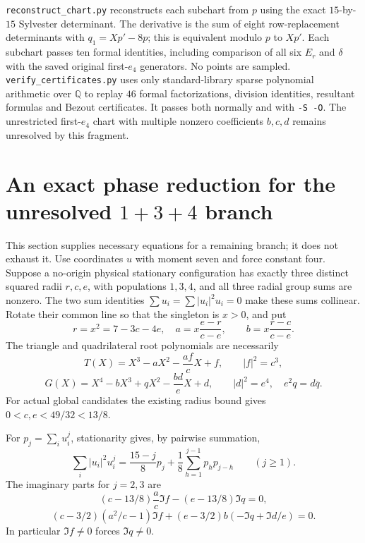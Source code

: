 \documentclass[11pt,a4paper]{article}
\theoremstyle{remark}
\begin{document}
\texttt{reconstruct\_chart.py} reconstructs each subchart from \(p\)
using the exact \(15\)-by-\(15\) Sylvester determinant. The derivative
is the sum of eight row-replacement determinants with
\(q_1=Xp'-8p\); this is equivalent modulo \(p\) to \(Xp'\).
Each subchart passes ten formal identities, including comparison of
all six \(E_r\) and \(\delta\) with the saved original first-\(e_4\)
generators. No points are sampled.
\texttt{verify\_certificates.py} uses only standard-library sparse
polynomial arithmetic over \(\mathbb Q\) to replay \(46\) formal
factorizations, division identities, resultant formulas and Bezout
certificates. It passes both normally and with \texttt{-S -O}.
The unrestricted first-\(e_4\) chart with multiple nonzero coefficients
\(b,c,d\) remains unresolved by this fragment.

\section{An exact phase reduction for the unresolved \texorpdfstring{\(1+3+4\)}{1+3+4} branch}
\label{sec:134-generic-phase}

This section supplies necessary equations for a remaining branch; it
does not exhaust it. Use coordinates \(u\) with moment seven and force
constant four. Suppose a no-origin physical stationary configuration
has exactly three distinct squared radii \(r,c,e\), with populations
\(1,3,4\), and all three radial group sums are nonzero. The two sum
identities \(\sum u_i=\sum |u_i|^2u_i=0\) make these sums collinear.
Rotate their common line so that the singleton is \(x>0\), and put
\[
 r=x^2=7-3c-4e,\quad
 a=x\frac{e-r}{c-e},\qquad b=x\frac{r-c}{c-e}.
\]
The triangle and quadrilateral root polynomials are necessarily
\[
 T(X)=X^3-aX^2-\frac{af}{c}X+f,\qquad |f|^2=c^3,
\]
\[
 G(X)=X^4-bX^3+qX^2-\frac{bd}{e}X+d,
 \qquad |d|^2=e^4,\quad e^2q=d\overline q.
\]
For actual global candidates the existing radius bound gives
\(0<c,e<49/32<13/8\).

For \(p_j=\sum_i u_i^j\), stationarity gives, by pairwise summation,
\begin{equation}\label{eq:134-new-recursion}
 \sum_i |u_i|^2u_i^j
 =\frac{15-j}{8}p_j+
       \frac18\sum_{h=1}^{j-1}p_hp_{j-h}\qquad(j\ge1).
\end{equation}
The imaginary parts for \(j=2,3\) are
\[
 (c-13/8)\frac ac\Im f-(e-13/8)\Im q=0,
\]
\[
 (c-3/2)(a^2/c-1)\Im f+
             (e-3/2)b(-\Im q+\Im d/e)=0.
\]
In particular \(\Im f\ne0\) forces \(\Im q\ne0\).
\end{document}
